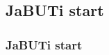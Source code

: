 \subsection{JaBUTi start}
\label{example:jabuti-start}

\begin{frame}
\frametitle{JaBUTi start}

\end{frame}
